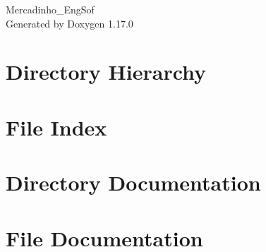 \documentclass[twoside]{book}
\newcommand{\+}{\discretionary{\mbox{\scriptsize$\hookleftarrow$}}{}{}}
\newcommand{\clearemptydoublepage}{%
    \newpage{\pagestyle{empty}\cleardoublepage}%
  }
\begin{document}
  \raggedbottom
    \hypersetup{pageanchor=false,
                bookmarksnumbered=true,
                pdfencoding=unicode
               }
  \begin{titlepage}
  \vspace*{7cm}
  \begin{center}%
  {\Large Mercadinho\+\_\+\+Eng\+Sof}\\
  \vspace*{1cm}
  {\large Generated by Doxygen 1.17.0}\\
  \end{center}
  \end{titlepage}
  \clearemptydoublepage
  \tableofcontents
  \clearemptydoublepage
  \hypersetup{pageanchor=true}

\chapter{Directory Hierarchy}

\chapter{File Index}

\chapter{Directory Documentation}


\chapter{File Documentation}













  \backmatter
  \newpage
  \clearemptydoublepage
  \printindex
\end{document}
